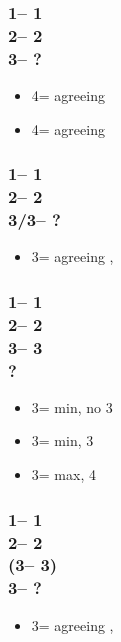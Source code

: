 \documentclass[12pt, a4paper]{article}
\begin{document}
\subsubsection*{1\hearts -- 1\spades\\
                2\hearts -- 2\nt\\
                3\spades -- ?}
\begin{itemize}
    \item 4\clubs = agreeing \hearts
    \item 4\diams = agreeing \spades
\end{itemize}

\subsubsection*{1\hearts -- 1\spades\\
                2\hearts -- 2\nt\\
                3\clubs/3\diams -- ?}
\begin{itemize}
    \item 3\spades = agreeing \spades, \gf
\end{itemize}

\subsubsection*{1\hearts -- 1\spades\\
                2\hearts -- 2\nt\\
                3\clubs -- 3\diams\\
                ?}
\begin{itemize}
    \item 3\hearts = min, no 3\spades
    \item 3\spades = min, 3\spades
    \item 3\nt = max, 4\clubs
\end{itemize}

\subsubsection*{1\hearts -- 1\spades\\
                2\hearts -- 2\nt\\
                (3\clubs -- 3\diams)\\
                3\hearts -- ?}
\begin{itemize}
    \item 3\spades = agreeing \hearts, \lsf
\end{itemize}


\end{document}
